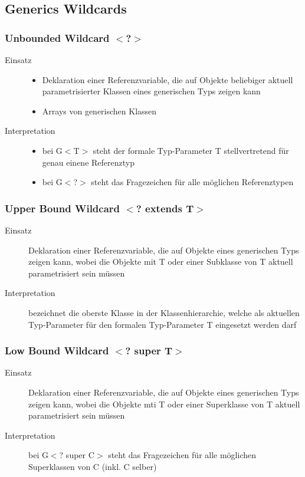 \documentclass[a4paper,10pt]{article}
\begin{document}
\subsection{Generics Wildcards}
\subsubsection{Unbounded Wildcard $<$?$>$}
\begin{description}
\item[Einsatz]
	\begin{itemize}
	\item Deklaration einer Referenzvariable, die auf Objekte beliebiger aktuell parametrisierter Klassen eines generischen Typs zeigen kann
	\item Arrays von generischen Klassen
	\end{itemize}
\item[Interpretation]
	\begin{itemize}
	\item bei G$<$T$>$ steht der formale Typ-Parameter T stellvertretend f\"ur genau einene Referenztyp
	\item bei G$<$?$>$ steht das Fragezeichen f\"ur alle m\"oglichen Referenztypen
	\end{itemize}
\end{description}


\subsubsection{Upper Bound Wildcard $<$? extends T$>$}
\begin{description}
\item[Einsatz] Deklaration einer Referenzvariable, die auf Objekte eines generischen Typs zeigen kann, wobei die Objekte mit T oder einer Subklasse von T aktuell parametrisiert sein m\"ussen
\item[Interpretation] bezeichnet die oberste Klasse in der Klassenhierarchie, welche als aktuellen Typ-Parameter f\"ur den formalen Typ-Parameter T eingesetzt werden darf
\end{description}


\subsubsection{Low Bound Wildcard $<$? super T$>$}
\begin{description}
\item[Einsatz] Deklaration einer Referenzvariable, die auf Objekte eines generischen Typs zeigen kann, wobei die Objekte mti T oder einer Superklasse von T aktuell parametrisiert sein m\"ussen
\item[Interpretation] bei G$<$? super C$>$ steht das Fragezeichen f\"ur alle m\"oglichen Superklassen von C (inkl. C selber)
\end{description}

\end{document}
